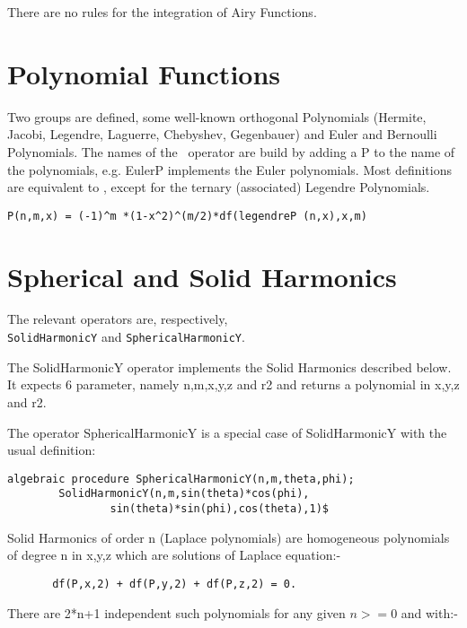 There are no rules for the integration of Airy Functions.

\section{Polynomial Functions}

Two groups are defined, some well-known orthogonal Polynomials
(Hermite, Jacobi, Legendre, Laguerre, Chebyshev, Gegenbauer)
and Euler and Bernoulli Polynomials.
The names of the \REDUCE\  operator are build by adding a P
to the name
of the polynomials, e.g. EulerP implements the Euler polynomials.
Most definitions are equivalent to \cite{Abramowitz:72}, except
for the ternary (associated) Legendre Polynomials.

\begin{verbatim}
P(n,m,x) = (-1)^m *(1-x^2)^(m/2)*df(legendreP (n,x),x,m)
\end{verbatim}

\section{Spherical and Solid Harmonics}
 

The relevant operators are, respectively,\\
{\tt SolidHarmonicY} and {\tt SphericalHarmonicY}.

The SolidHarmonicY operator implements the Solid Harmonics
described below. It expects 6 parameter, namely n,m,x,y,z and r2
and returns a polynomial in x,y,z and r2.

The operator
SphericalHarmonicY is a special case of SolidHarmonicY
with the usual definition:

\begin{verbatim}
algebraic procedure SphericalHarmonicY(n,m,theta,phi);
        SolidHarmonicY(n,m,sin(theta)*cos(phi),
                sin(theta)*sin(phi),cos(theta),1)$
\end{verbatim}


Solid Harmonics of order n (Laplace polynomials)
are homogeneous polynomials of degree n in x,y,z
which are solutions of Laplace equation:-

\begin{verbatim}
       df(P,x,2) + df(P,y,2) + df(P,z,2) = 0.
\end{verbatim}

There are 2*n+1 independent such polynomials for any given $n >=0$
and with:-

